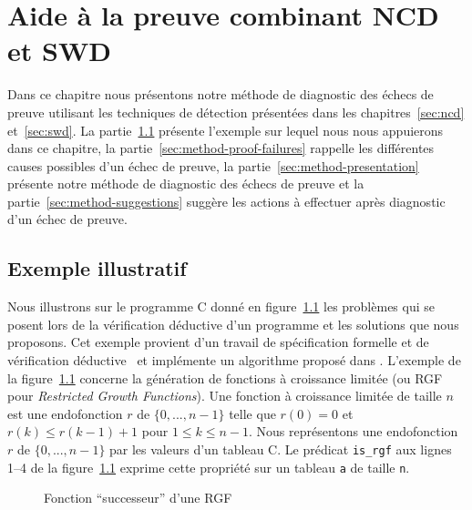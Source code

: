 
\chapter{Aide à la preuve combinant NCD et SWD}
\label{sec:method}

\chapterintro


Dans ce chapitre nous présentons notre méthode de diagnostic des échecs de
preuve utilisant les techniques de détection présentées dans les
chapitres~\ref{sec:ncd} et~\ref{sec:swd}.
La partie~\ref{sec:method-ex} présente l'exemple sur lequel nous nous
appuierons dans ce chapitre, la partie~\ref{sec:method-proof-failures} rappelle
les différentes causes possibles d'un échec de preuve, la
partie~\ref{sec:method-presentation} présente notre méthode de diagnostic des
échecs de preuve et la partie~\ref{sec:method-suggestions} suggère les actions
à effectuer après diagnostic d'un échec de preuve.


\section{Exemple illustratif}
\label{sec:method-ex}


Nous illustrons sur le programme C donné en figure~\ref{fig:rgf1} les problèmes
qui se posent lors de la vérification déductive d'un programme et les solutions
que nous proposons.
Cet exemple provient d'un travail de spécification formelle et de vérification
déductive~\cite{Genestier/TAP15} et implémente un algorithme proposé
dans \cite[page 235]{Arndt/10}.
L'exemple de la figure~\ref{fig:rgf1} concerne la génération de fonctions à
croissance limitée (ou RGF pour \textit{Restricted Growth Functions}).
Une fonction à croissance limitée de taille $n$ est une endofonction $r$ de
$\{0, ..., n-1\}$ telle que $r(0) = 0$ et $r(k) \le r(k-1)+1$ pour
$1 \le k \le n-1$.
Nous représentons une endofonction $r$ de $\{0, ..., n-1\}$ par les valeurs d'un
tableau C.
Le prédicat \acsl \lstinline{is_rgf} aux lignes 1--4 de la figure~\ref{fig:rgf1}
exprime cette propriété sur un tableau \lstinline'a' de taille \lstinline'n'.


\begin{figure}[tb]
  \centering
  
  \caption{Fonction ``successeur'' d'une RGF \label{fig:rgf1}}
\end{figure}


